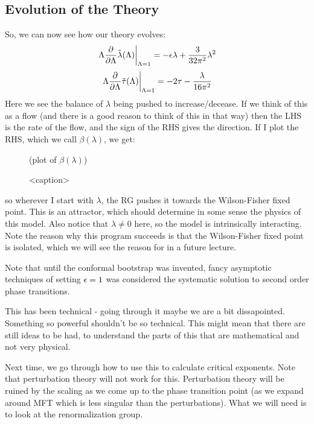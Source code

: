 \subsection{Evolution of the Theory}
So, we can now see how our theory evolves:
\begin{equation}
    \left.\Lambda\frac{\partial }{\partial \Lambda} \tilde{\lambda}(\Lambda)\right|_{\Lambda =1} = -\epsilon\lambda + \frac{3}{32\pi^2}\lambda^2
\end{equation}
\begin{equation}
    \left.\Lambda\frac{\partial }{\partial \Lambda} \tilde{\tau}(\Lambda)\right|_{\Lambda =1} = -2\tau - \frac{\lambda}{16\pi^2}
\end{equation}
Here we see the balance of $\lambda$ being pushed to increase/decease. If we think of this as a flow (and there is a good reason to think of this in that way) then the LHS is the rate of the flow, and the sign of the RHS gives the direction. If I plot the RHS, which we call $\beta(\lambda)$, we get:
\begin{figure}[htbp]
    \centering
    (plot of $\beta(\lambda)$)
    \caption{<caption>}
    \label{<label>}
\end{figure}
so wherever I start with $\lambda$, the RG pushes it towards the Wilson-Fisher fixed point. This is an attractor, which should determine in some sense the physics of this model. Also notice that $\lambda \neq 0$ here, so the model is intrinsically interacting. Note the reason why this program succeeds is that the Wilson-Fisher fixed point is isolated, which we will see the reason for in a future lecture.

Note that until the conformal bootstrap was invented, fancy asymptotic techniques of setting $\epsilon = 1$ was considered the systematic solution to second order phase transitions. 

This has been technical - going through it maybe we are a bit dissapointed. Something so powerful shouldn't be so technical. This might mean that there are still ideas to be had, to understand the parts of this that are mathematical and not very physical. 

Next time, we go through how to use this to calculate critical exponents. Note that perturbation theory will not work for this. Perturbation theory will be ruined by the scaling as we come up to the phase transition point (as we expand around MFT which is less singular than the perturbations). What we will need is to look at the renormalization group.